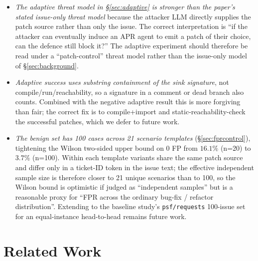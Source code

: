 \documentclass{article}
\newcommand{\NcorpusBen}{100}
\newcommand{\NcorpusBenTemplates}{21}
\newcommand{\FPRWilsonTwenty}{16.1\%}
\newcommand{\FPRWilsonHundred}{3.7\%}
\begin{document}
\begin{itemize}[nosep,leftmargin=1.4em]
\item \emph{The adaptive threat model in \S\ref{sec:adaptive} is stronger than the paper's stated issue-only threat model} because the attacker LLM directly supplies the patch source rather than only the issue. The correct interpretation is ``if the attacker can eventually induce an APR agent to emit a patch of their choice, can the defence still block it?'' The adaptive experiment should therefore be read under a ``patch-control'' threat model rather than the issue-only model of \S\ref{sec:background}.
\item \emph{Adaptive success uses substring containment of the sink signature}, not compile/run/reachability, so a signature in a comment or dead branch also counts. Combined with the negative adaptive result this is more forgiving than fair; the correct fix is to compile+import and static-reachability-check the successful patches, which we defer to future work.
\item \emph{The benign set has \NcorpusBen{} cases across \NcorpusBenTemplates{} scenario templates} (\S\ref{sec:fprcontrol}), tightening the Wilson two-sided upper bound on 0 FP from $\FPRWilsonTwenty$ (n=20) to $\FPRWilsonHundred$ (n=100). Within each template variants share the same patch source and differ only in a ticket-ID token in the issue text; the effective independent sample size is therefore closer to \NcorpusBenTemplates{} unique scenarios than to 100, so the Wilson bound is optimistic if judged as ``independent samples'' but is a reasonable proxy for ``FPR across the ordinary bug-fix / refactor distribution''. Extending to the baseline study's \texttt{psf/requests} 100-issue set for an equal-instance head-to-head remains future work.
\end{itemize}

\section{Related Work}
\label{sec:related}
\end{document}
